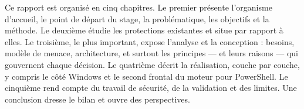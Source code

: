 Ce rapport est organisé en cinq chapitres. Le premier présente l'organisme d'accueil, le point
de départ du stage, la problématique, les objectifs et la méthode. Le deuxième étudie les
protections existantes et situe \demo{} par rapport à elles. Le troisième, le plus important,
expose l'analyse et la conception : besoins, modèle de menace, architecture, et surtout les
principes --- et leurs raisons --- qui gouvernent chaque décision. Le quatrième décrit la
réalisation, couche par couche, y compris le côté Windows et le second frontal du moteur pour
PowerShell. Le cinquième rend compte du travail de sécurité, de la validation et des limites.
Une conclusion dresse le bilan et ouvre des perspectives.
